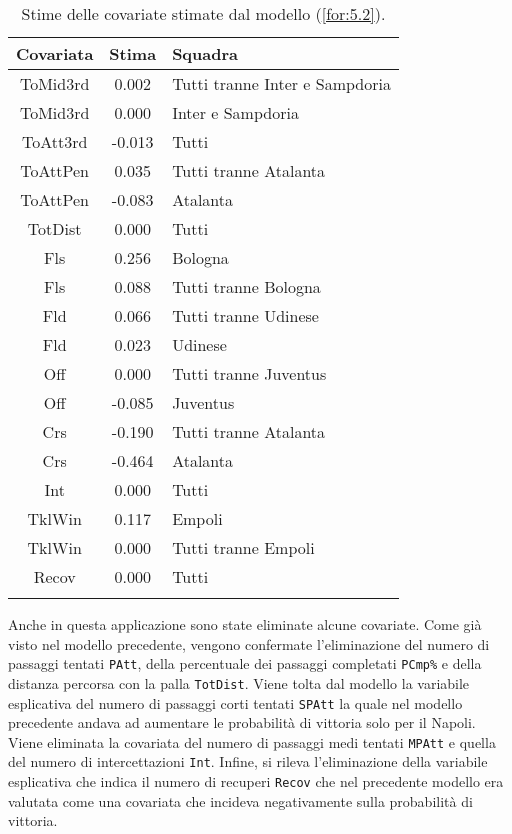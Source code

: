 \begin{table}[]%
	
	\renewcommand{\arraystretch}{1.7}
	\centering
	\begin{tabular}{ccp{10cm}}
		\hline	
		
		\textbf{Covariata} & \textbf{Stima} & \textbf{Squadra} \\	
		\hline
		ToMid3rd & 0.002 & Tutti tranne Inter e Sampdoria\\
		ToMid3rd & 0.000 & Inter e Sampdoria\\
		ToAtt3rd & -0.013 & Tutti \\  
		ToAttPen & 0.035 & Tutti tranne Atalanta \\    
		ToAttPen & -0.083 & Atalanta \\ 	     	 
		TotDist & 0.000 & Tutti \\	
		Fls & 0.256 & Bologna  \\
		Fls & 0.088 & Tutti tranne Bologna \\ 		
		Fld & 0.066 & Tutti tranne Udinese \\
		Fld & 0.023 & Udinese \\
		Off & 0.000 & Tutti tranne Juventus\\
		Off & -0.085 & Juventus  \\
		Crs & -0.190 & Tutti tranne Atalanta\\
		Crs & -0.464 & Atalanta \\
		Int & 0.000 & Tutti\\
		TklWin &  0.117 & Empoli  \\
		TklWin &  0.000 & Tutti tranne Empoli  \\ 
		Recov &  0.000 & Tutti \\ 
		\hline
		& &  \\
		
	\end{tabular} \hbox{}
	\caption{Stime delle covariate stimate dal modello (\ref{for:5.2}).} \label{tab:BTCLI3} 
	
\end{table}
Anche in questa applicazione sono state eliminate alcune covariate. Come già visto nel modello precedente, vengono confermate l'eliminazione del numero di passaggi tentati \texttt{PAtt}, della percentuale dei passaggi completati \texttt{PCmp\%} e della distanza percorsa con la palla \texttt{TotDist}. Viene tolta dal modello la variabile esplicativa del numero di passaggi corti tentati \texttt{SPAtt} la quale nel modello precedente andava ad aumentare le probabilità di vittoria solo per il Napoli. Viene eliminata la covariata del numero di passaggi medi tentati \texttt{MPAtt} e quella del numero di intercettazioni \texttt{Int}. Infine, si rileva l'eliminazione della variabile esplicativa che indica il numero di recuperi \texttt{Recov} che nel precedente modello era valutata come una covariata che incideva negativamente sulla probabilità di vittoria.\\
